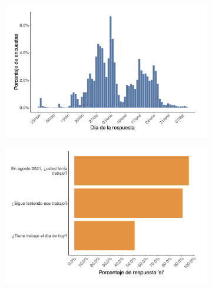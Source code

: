 \documentclass[oneside,11pt]{article}
\begin{document}
\begin{figure}[H]
    \caption{Worker Survey Graphs}
    \label{worker_survey_1}
    \begin{center}

    \begin{subfigure}{0.49\textwidth}
    \includegraphics[width=\textwidth]{04_Figures/worker_survey/Exp_1.png}
    \end{subfigure}
    \begin{subfigure}{0.49\textwidth}
    \includegraphics[width=\textwidth]{04_Figures/worker_survey/Exp_2.png}
    \end{subfigure}
    

\end{center}
\end{figure}
\end{document}
